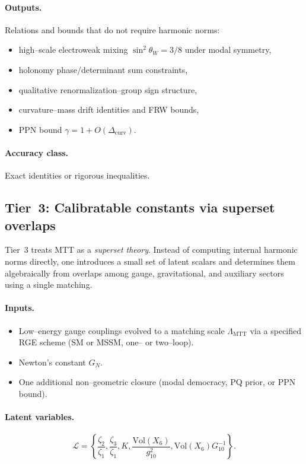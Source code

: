 \documentclass[11pt]{article}
\begin{document}
\paragraph{Outputs.}
Relations and bounds that do not require harmonic norms:
\begin{itemize}
  \item high--scale electroweak mixing
        $\sin^2\theta_W = 3/8$ under modal symmetry,
  \item holonomy phase/determinant sum constraints,
  \item qualitative renormalization--group sign structure,
  \item curvature--mass drift identities and FRW bounds,
  \item PPN bound $\gamma = 1 + O(\Delta_{\mathrm{curv}})$.
\end{itemize}

\paragraph{Accuracy class.}
Exact identities or rigorous inequalities.

\subsection{Tier~3: Calibratable constants via superset overlaps}

Tier~3 treats MTT as a \emph{superset theory}.
Instead of computing internal harmonic norms directly, one introduces a
small set of latent scalars and determines them algebraically from
overlaps among gauge, gravitational, and auxiliary sectors using a
single matching.

\paragraph{Inputs.}
\begin{itemize}
  \item Low--energy gauge couplings evolved to a matching scale
        $\Lambda_{\mathrm{MTT}}$ via a specified RGE scheme (SM or MSSM,
        one-- or two--loop).
  \item Newton's constant $G_N$.
  \item One additional non--geometric closure (modal democracy, PQ
        prior, or PPN bound).
\end{itemize}

\paragraph{Latent variables.}
\[
\mathcal{L} =
\left\{
\frac{\zeta_2}{\zeta_1},
\frac{\zeta_3}{\zeta_1},
K,
\frac{\mathrm{Vol}(X_6)}{g_{10}^2},
\mathrm{Vol}(X_6) G_{10}^{-1}
\right\}.
\]
\end{document}
